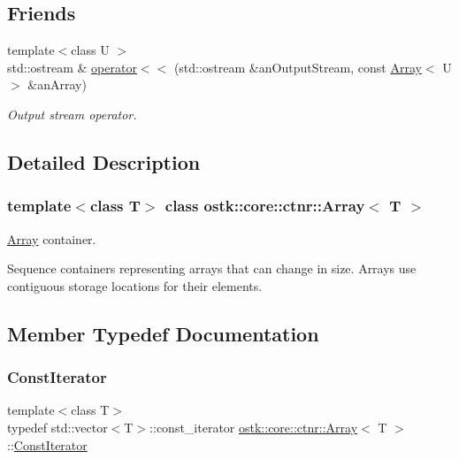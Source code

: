 \subsection*{Friends}
\begin{DoxyCompactItemize}
\item 
{\footnotesize template$<$class U $>$ }\\std\+::ostream \& \hyperlink{classostk_1_1core_1_1ctnr_1_1_array_a9daa2d638e5bd693776f8bf6caae0802}{operator$<$$<$} (std\+::ostream \&an\+Output\+Stream, const \hyperlink{classostk_1_1core_1_1ctnr_1_1_array}{Array}$<$ U $>$ \&an\+Array)
\begin{DoxyCompactList}\small\item\em Output stream operator. \end{DoxyCompactList}\end{DoxyCompactItemize}


\subsection{Detailed Description}
\subsubsection*{template$<$class T$>$\newline
class ostk\+::core\+::ctnr\+::\+Array$<$ T $>$}

\hyperlink{classostk_1_1core_1_1ctnr_1_1_array}{Array} container. 

Sequence containers representing arrays that can change in size. Arrays use contiguous storage locations for their elements. 

\subsection{Member Typedef Documentation}
\mbox{\label{classostk_1_1core_1_1ctnr_1_1_array_acf6e5ab86e3ad3e125f61b1933772a14}} 
\subsubsection{\texorpdfstring{Const\+Iterator}{ConstIterator}}
{\footnotesize\ttfamily template$<$class T$>$ \\
typedef std\+::vector$<$T$>$\+::const\+\_\+iterator \hyperlink{classostk_1_1core_1_1ctnr_1_1_array}{ostk\+::core\+::ctnr\+::\+Array}$<$ T $>$\+::\hyperlink{classostk_1_1core_1_1ctnr_1_1_array_acf6e5ab86e3ad3e125f61b1933772a14}{Const\+Iterator}}

